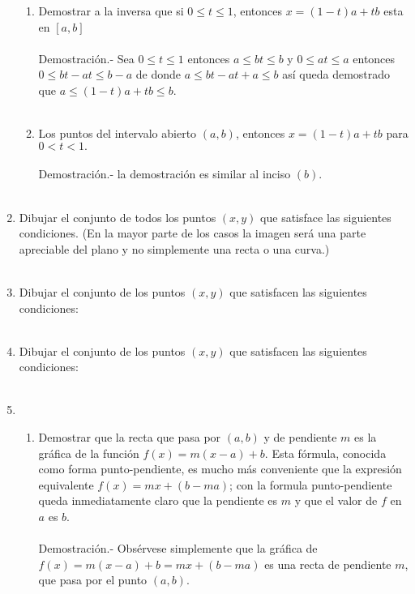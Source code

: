 \begin{enumerate}[\bfseries 1.]
\begin{enumerate}[\bfseries (a)]
	\item Demostrar a la inversa que si $0\leq t \leq 1$, entonces $x=(1-t)a+tb$ esta en $[a,b]$\\\\
	    Demostración.-\; Sea $0\leq t \leq 1$ entonces $a\leq bt\leq b$ y $0\leq at\leq a$ entonces $0\leq bt-at\leq b-a$ de donde $a\leq bt-at+a \leq b$ así queda demostrado que $a\leq (1-t)a + tb \leq b$.\\\\

	\item Los puntos del intervalo abierto $(a,b)$, entonces $x=(1-t)a + tb$ para $0<t<1.$\\\\
	    Demostración.-\; la demostración es similar al inciso $(b)$.\\\\

    \end{enumerate}
    
    \item Dibujar el conjunto de todos los puntos $(x,y)$ que satisface las siguientes condiciones. (En la mayor parte de los casos la imagen será una parte apreciable del plano y no simplemente una recta o una curva.)\\\\

    \item Dibujar el conjunto de los puntos $(x,y)$ que satisfacen las siguientes condiciones:\\\\

    \item Dibujar el conjunto de los puntos $(x,y)$ que satisfacen las siguientes condiciones:\\\\

    \item 
    \begin{enumerate}[\bfseries (a)]
	
	\item Demostrar que la recta que pasa por $(a,b)$ y de pendiente $m$ es la gráfica de la función $f(x)=m(x-a)+b.$ Esta fórmula, conocida como forma punto-pendiente, es mucho más conveniente que la expresión equivalente $f(x)=mx+(b-ma)$; con la formula punto-pendiente queda inmediatamente claro que la pendiente es $m$ y que el valor de $f$ en $a$ es $b$.\\\\
	    Demostración.-\; Obsérvese simplemente que la gráfica de $f(x)=m(x-a)+b=mx+(b-ma)$ es una recta de pendiente $m$, que pasa por el punto $(a,b)$.\\\\


\end{enumerate}
\end{enumerate}
